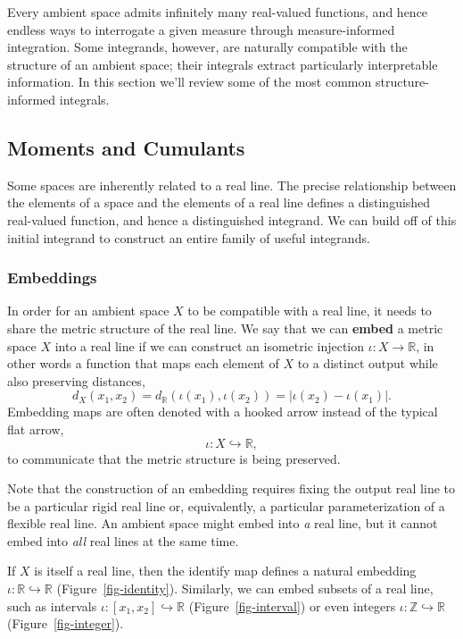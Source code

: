 \documentclass[
  letterpaper,
  DIV=11,
  numbers=noendperiod]{scrartcl}
\begin{document}
Every ambient space admits infinitely many real-valued functions, and
hence endless ways to interrogate a given measure through
measure-informed integration. Some integrands, however, are naturally
compatible with the structure of an ambient space; their integrals
extract particularly interpretable information. In this section we'll
review some of the most common structure-informed integrals.

\subsection{Moments and Cumulants}\label{moments-and-cumulants}

Some spaces are inherently related to a real line. The precise
relationship between the elements of a space and the elements of a real
line defines a distinguished real-valued function, and hence a
distinguished integrand. We can build off of this initial integrand to
construct an entire family of useful integrands.

\subsubsection{Embeddings}\label{embeddings}

In order for an ambient space \(X\) to be compatible with a real line,
it needs to share the metric structure of the real line. We say that we
can \textbf{embed} a metric space \(X\) into a real line if we can
construct an isometric injection \(\iota : X \rightarrow \mathbb{R}\),
in other words a function that maps each element of \(X\) to a distinct
output while also preserving distances, \[
d_{X}(x_{1}, x_{2})
= d_{\mathbb{R}}(\iota(x_{1}), \iota(x_{2}))
= | \iota(x_{2}) - \iota(x_{1}) |.
\] Embedding maps are often denoted with a hooked arrow instead of the
typical flat arrow, \[
\iota : X \hookrightarrow \mathbb{R},
\] to communicate that the metric structure is being preserved.

Note that the construction of an embedding requires fixing the output
real line to be a particular rigid real line or, equivalently, a
particular parameterization of a flexible real line. An ambient space
might embed into \emph{a} real line, but it cannot embed into \emph{all}
real lines at the same time.

If \(X\) is itself a real line, then the identify map defines a natural
embedding \(\iota : \mathbb{R} \hookrightarrow \mathbb{R}\)
(Figure~\ref{fig-identity}). Similarly, we can embed subsets of a real
line, such as intervals
\(\iota : [x_{1}, x_{2}] \hookrightarrow \mathbb{R}\)
(Figure~\ref{fig-interval}) or even integers
\(\iota : \mathbb{Z} \hookrightarrow \mathbb{R}\)
(Figure~\ref{fig-integer}).
\end{document}
